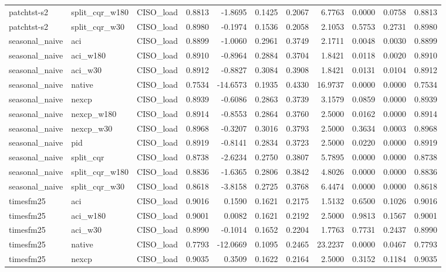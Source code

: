\begin{tabular}{lllrrrrrrrr}
patchtst-s2 & split_cqr_w180 & CISO_load & 0.8813 & -1.8695 & 0.1425 & 0.2067 & 6.7763 & 0.0000 & 0.0758 & 0.8813 \\
patchtst-s2 & split_cqr_w30 & CISO_load & 0.8980 & -0.1974 & 0.1536 & 0.2058 & 2.1053 & 0.5753 & 0.2731 & 0.8980 \\
seasonal_naive & aci & CISO_load & 0.8899 & -1.0060 & 0.2961 & 0.3749 & 2.1711 & 0.0048 & 0.0030 & 0.8899 \\
seasonal_naive & aci_w180 & CISO_load & 0.8910 & -0.8964 & 0.2884 & 0.3704 & 1.8421 & 0.0118 & 0.0020 & 0.8910 \\
seasonal_naive & aci_w30 & CISO_load & 0.8912 & -0.8827 & 0.3084 & 0.3908 & 1.8421 & 0.0131 & 0.0104 & 0.8912 \\
seasonal_naive & native & CISO_load & 0.7534 & -14.6573 & 0.1935 & 0.4330 & 16.9737 & 0.0000 & 0.0000 & 0.7534 \\
seasonal_naive & nexcp & CISO_load & 0.8939 & -0.6086 & 0.2863 & 0.3739 & 3.1579 & 0.0859 & 0.0000 & 0.8939 \\
seasonal_naive & nexcp_w180 & CISO_load & 0.8914 & -0.8553 & 0.2864 & 0.3760 & 2.5000 & 0.0162 & 0.0000 & 0.8914 \\
seasonal_naive & nexcp_w30 & CISO_load & 0.8968 & -0.3207 & 0.3016 & 0.3793 & 2.5000 & 0.3634 & 0.0003 & 0.8968 \\
seasonal_naive & pid & CISO_load & 0.8919 & -0.8141 & 0.2834 & 0.3723 & 2.5000 & 0.0220 & 0.0000 & 0.8919 \\
seasonal_naive & split_cqr & CISO_load & 0.8738 & -2.6234 & 0.2750 & 0.3807 & 5.7895 & 0.0000 & 0.0000 & 0.8738 \\
seasonal_naive & split_cqr_w180 & CISO_load & 0.8836 & -1.6365 & 0.2806 & 0.3842 & 4.8026 & 0.0000 & 0.0000 & 0.8836 \\
seasonal_naive & split_cqr_w30 & CISO_load & 0.8618 & -3.8158 & 0.2725 & 0.3768 & 6.4474 & 0.0000 & 0.0000 & 0.8618 \\
timesfm25 & aci & CISO_load & 0.9016 & 0.1590 & 0.1621 & 0.2175 & 1.5132 & 0.6500 & 0.1026 & 0.9016 \\
timesfm25 & aci_w180 & CISO_load & 0.9001 & 0.0082 & 0.1621 & 0.2192 & 2.5000 & 0.9813 & 0.1567 & 0.9001 \\
timesfm25 & aci_w30 & CISO_load & 0.8990 & -0.1014 & 0.1652 & 0.2204 & 1.7763 & 0.7731 & 0.2437 & 0.8990 \\
timesfm25 & native & CISO_load & 0.7793 & -12.0669 & 0.1095 & 0.2465 & 23.2237 & 0.0000 & 0.0467 & 0.7793 \\
timesfm25 & nexcp & CISO_load & 0.9035 & 0.3509 & 0.1622 & 0.2164 & 2.5000 & 0.3152 & 0.1184 & 0.9035 \\

\end{tabular}
